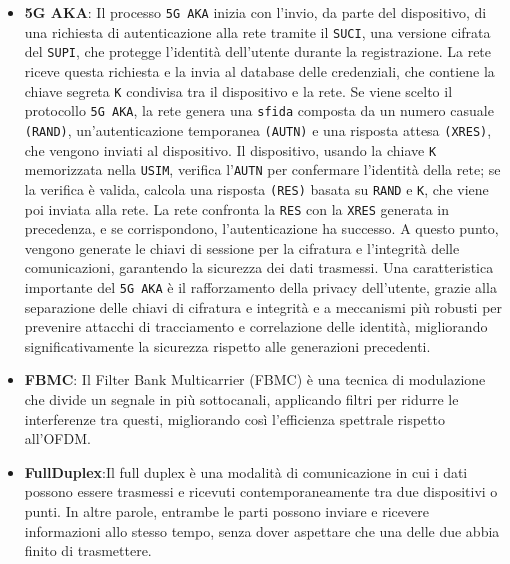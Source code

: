 \documentclass[english]{article}
\begin{document}
\begin{itemize}
	\item \textbf{\hypertarget{5G AKA}{5G AKA}}: Il processo \texttt{5G AKA} inizia con l'invio,
	      da parte del dispositivo, di una richiesta di autenticazione alla rete tramite il \texttt{SUCI},
	      una versione cifrata del \texttt{SUPI}, che protegge l'identità dell'utente durante la registrazione.
	      La rete riceve questa richiesta e la invia al database delle credenziali,
	      che contiene la chiave segreta \texttt{K} condivisa tra il dispositivo e la rete.
	      Se viene scelto il protocollo \texttt{5G AKA}, la rete genera una \texttt{sfida}
	      composta da un numero casuale \texttt{(RAND)}, un'autenticazione temporanea \texttt{(AUTN)}
	      e una risposta attesa \texttt{(XRES)}, che vengono inviati al dispositivo.
	      Il dispositivo, usando la chiave \texttt{K} memorizzata nella \texttt{USIM},
	      verifica l'\texttt{AUTN} per confermare l'identità della rete;
	      se la verifica è valida, calcola una risposta \texttt{(RES)} basata su \texttt{RAND} e \texttt{K},
	      che viene poi inviata alla rete. La rete confronta la \texttt{RES} con la \texttt{XRES} generata in precedenza,
	      e se corrispondono, l'autenticazione ha successo.\@
	      A questo punto, vengono generate le chiavi di sessione per la cifratura
	      e l'integrità delle comunicazioni, garantendo la sicurezza dei dati trasmessi.
	      Una caratteristica importante del \texttt{5G AKA} è il rafforzamento della privacy dell'utente,
	      grazie alla separazione delle chiavi di cifratura e integrità e a meccanismi più robusti
	      per prevenire attacchi di tracciamento e correlazione delle identità,
	      migliorando significativamente la sicurezza rispetto alle generazioni precedenti.\@

	\item \textbf{FBMC}\hypertarget{FBMC}{}: Il Filter Bank Multicarrier (FBMC) è una tecnica di
	      modulazione che divide un segnale in più sottocanali, applicando filtri per ridurre
	      le interferenze tra questi, migliorando così l'efficienza spettrale rispetto all'OFDM.\@

	\item \textbf{FullDuplex}\hypertarget{FullDuplex}{}:Il full duplex è una modalità di comunicazione
	      in cui i dati possono essere trasmessi e ricevuti contemporaneamente tra due dispositivi
	      o punti. In altre parole, entrambe le parti possono inviare e ricevere informazioni allo
	      stesso tempo, senza dover aspettare che una delle due abbia finito di trasmettere.


\end{itemize}
\end{document}
